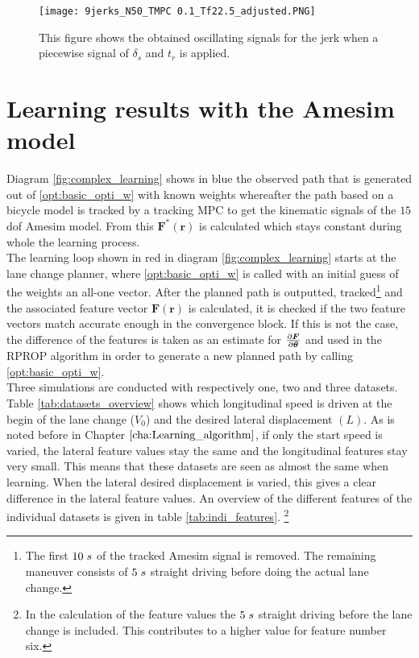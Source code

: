 \begin{figure}[h!]
	\centering
	\texttt{[image: 9jerks\_N50\_TMPC 0.1\_Tf22.5\_adjusted.PNG]}
	\caption{This figure shows the obtained oscillating signals for the jerk when a piecewise signal of $\delta_s$ and $t_r$ is applied.}	
	\label{fig:old_inputs}
\end{figure}

\section{Learning results with the Amesim model}
\label{s:complex_learning_results}
Diagram \ref{fig:complex_learning} shows in blue the observed path that is generated out of \ref{opt:basic_opti_w} with known weights whereafter the path based on a bicycle model is tracked by a tracking MPC to get the kinematic signals of the $15$ dof Amesim model. From this $\bm{F}^*(\bm{r})$ is calculated which stays constant during whole the learning process.\\

The learning loop shown in red in diagram \ref{fig:complex_learning} starts at the lane change planner, where \ref{opt:basic_opti_w} is called with an initial guess of the weights an all-one vector. After the planned path is outputted, tracked\footnote{The first $10 \hspace{1mm}s$ of the tracked Amesim signal is removed. The remaining maneuver consists of $5 \hspace{1mm}s$ straight driving before doing the actual lane change.} and the associated feature vector $\bm{F}(\bm{r})$ is calculated, it is checked if the two feature vectors match accurate enough in the convergence block. If this is not the case, the difference of the features is taken as an estimate for $\pdv{\bm{F}}{\bm{\theta}}$ and used in the RPROP algorithm in order to generate a new planned path by calling \ref{opt:basic_opti_w}. \\

Three simulations are conducted with respectively one, two and three datasets. Table \ref{tab:datasets_overview} shows which longitudinal speed is driven at the begin of the lane change ($V_{0}$) and the desired lateral displacement $(L)$. As is noted before in Chapter $\ref{cha:Learning_algorithm}$, if only the start speed is varied, the lateral feature values stay the same and the longitudinal features stay very small. This means that these datasets are seen as almost the same when learning. When the lateral desired displacement is varied, this gives a clear difference in the lateral feature values. An overview of the different features of the individual datasets is given in table \ref{tab:indi_features}. \footnote{In the calculation of the feature values the $5 \hspace{1mm}s$ straight driving before the lane change is included. This contributes to a higher value for feature number six.} 



